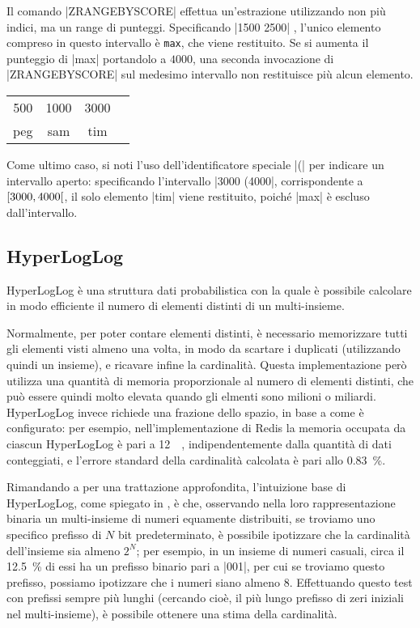 Il comando \cverb|ZRANGEBYSCORE| effettua un'estrazione utilizzando non più indici, ma un range di
punteggi. Specificando \cverb|1500 2500| , l'unico elemento compreso in questo intervallo è
\verb|max|, che viene restituito. Se si aumenta il punteggio di \cverb|max| portandolo a $4000$,
una seconda invocazione di \cverb|ZRANGEBYSCORE| sul medesimo intervallo non restituisce più
alcun elemento.

\begin{center}
	\begin{tabular}{|*{4}{c|}}
	  \hline
	  \num{500} & \num{1000} & \num{3000} & \cellcolor{blue!25}{\num{4000}} \\ 
	  peg & sam & tim & \cellcolor{blue!25}{max} \\ 
	  \hline
	\end{tabular}
\end{center}

Come ultimo caso, si noti l'uso dell'identificatore speciale \cverb|(| per indicare un intervallo
aperto: specificando l'intervallo \cverb|3000 (4000|, corrispondente a 
$\interval[open right]{3000}{4000}$, il solo elemento \cverb|tim| viene restituito, poiché \cverb|max|
è escluso dall'intervallo.

\subsection{HyperLogLog}

HyperLogLog \cite{hyperloglog} è una struttura dati probabilistica con la quale è possibile
calcolare in modo efficiente il numero di elementi distinti di un multi-insieme. 

Normalmente, per poter contare elementi distinti, è necessario memorizzare tutti gli elementi visti
almeno una volta, in modo da scartare i duplicati (utilizzando quindi un insieme), e ricavare infine
la cardinalità. Questa implementazione però utilizza una quantità di memoria proporzionale al numero
di elementi distinti, che può essere quindi molto elevata quando gli elmenti sono milioni o
miliardi. HyperLogLog invece richiede una frazione dello spazio, in base a come è configurato: per
esempio, nell'implementazione di Redis la memoria occupata da ciascun HyperLogLog è pari a
\SI{12}{\kibi\byte}, indipendentemente dalla quantità di dati conteggiati, e l'errore standard della
cardinalità calcolata è pari allo \SI{0.83}{\percent}.

Rimandando a \cite{hyperloglog} per una trattazione approfondita, l'intuizione base di HyperLogLog,
come spiegato in \cite{hyperloglog-explain}, è che, osservando nella loro rappresentazione binaria
un multi-insieme di numeri equamente distribuiti, se troviamo uno specifico prefisso di $N$ bit
predeterminato, è possibile ipotizzare che la cardinalità dell'insieme sia almeno $2^N$; per
esempio, in un insieme di numeri casuali, circa il \SI{12.5}{\percent} di essi ha un prefisso
binario pari a \cverb|001|, per cui se troviamo questo prefisso, possiamo ipotizzare che i numeri
siano almeno \num{8}. Effettuando questo test con prefissi sempre più lunghi (cercando cioè, il più
lungo prefisso di zeri iniziali nel multi-insieme), è possibile ottenere una stima della
cardinalità.

